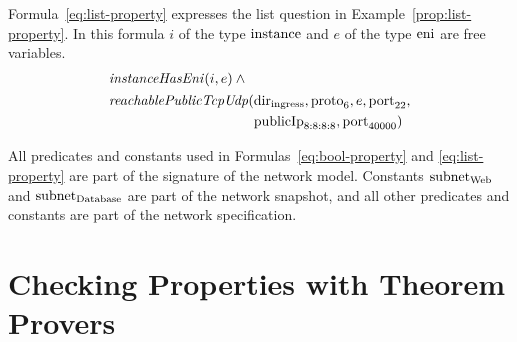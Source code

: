 
Formula~\ref{eq:list-property} expresses the list question in Example~\ref{prop:list-property}. In this formula $i$ of the type $\mathrm{instance}$ and $e$ of the type $\mathrm{eni}$ are free variables.
\begin{equation}\label{eq:list-property}
\begin{aligned}
&\mathit{instanceHasEni}(i,e)\:\wedge~\\
&\begin{aligned}
   \mathit{reachablePublicTcpUdp}(&\mathrm{dir}_\text{ingress}, \mathrm{proto}_6, e, \mathrm{port}_{22},\\
                                &\mathrm{publicIp}_\text{8:8:8:8}, \mathrm{port}_\text{40000})
 \end{aligned}
\end{aligned}
\end{equation}

All predicates and constants used in Formulas~\ref{eq:bool-property} and \ref{eq:list-property} are part of the signature of the network model. Constants $\mathrm{subnet}_\text{Web}$ and $\mathrm{subnet}_\text{Database}$ are part of the network snapshot, and all other predicates and constants are part of the network specification.

% 

\section{Checking Properties with Theorem Provers}
\label{sect:aws/fol-provers}

